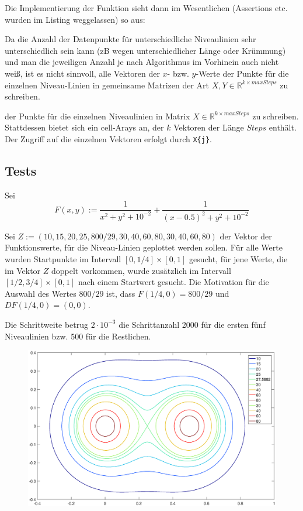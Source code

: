 \documentclass[a4paper,11pt,bibliography=totoc,listof=totoc,headinclude=true,cleardoublepage=empty,oneside]{scrartcl}
\newcommand{\R}{\mathbb{R}}
\begin{document}
Die Implementierung der Funktion sieht dann im Wesentlichen (Assertions etc. wurden im Listing weggelassen) so aus:




Da die Anzahl der Datenpunkte für unterschiedliche Niveaulinien sehr unterschiedlich sein kann (zB wegen unterschiedlicher Länge oder Krümmung) und man die jeweiligen Anzahl je nach Algorithmus im Vorhinein auch nicht weiß, ist es nicht sinnvoll, alle Vektoren der $x$- bzw. $y$-Werte der Punkte für die einzelnen Niveau-Linien in gemeinsame Matrizen der Art $X, Y \in \R^{k \times maxSteps}$ zu schreiben.


der Punkte für die einzelnen Niveaulinien in Matrix $X \in \R^{k \times maxSteps}$ zu schreiben. Stattdessen bietet sich ein cell-Arays an, der $k$ Vektoren der Länge $Steps$ enthält. Der Zugriff auf die einzelnen Vektoren erfolgt durch \verb|X{j}|.

\subsection{Tests}
Sei %
\[
F(x,y) := \frac{1}{x^2+y^2+10^{-2}} + \frac{1}{(x-0.5)^2+y^2+10^{-2}}
\]

Sei $Z:= (10,15,20,25,800/29,30,40,60,80,30,40,60,80)$ der Vektor der Funktionswerte, für die Niveau-Linien geplottet werden sollen. Für alle Werte wurden Startpunkte im Intervall $[0,1/4]\times[0,1]$ gesucht, für jene Werte, die im Vektor $Z$ doppelt vorkommen, wurde zusätzlich im Intervall $[1/2,3/4]\times[0,1]$ nach einem Startwert gesucht. Die Motivation für die Auswahl des Wertes $800/29$ ist, dass $F(1/4,0)=800/29$ und $DF(1/4,0)=(0,0)$.

Die Schrittweite betrug $2\cdot 10^{-3}$ die Schrittanzahl 2000 für die ersten fünf Niveaulinien bzw. 500 für die Restlichen.

\begin{figure}[H]
	\centering
	\includegraphics[trim = 41mm 0mm 35mm 0mm, clip, width=\linewidth]{plots/niveau/test5_}

\end{figure}
\end{document}
